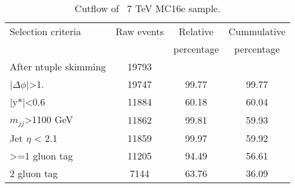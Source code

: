 \begin{table}[ht]
\begin{center}
\begin{tabular}{|l|c|c|c|}
\hline
Selection criteria & Raw events &  Relative & Cummulative \\
 & & percentage & percentage \\
\hline
After ntuple skimming & 19793 &  &  \\
$|\Delta\phi|$>1. & 19747 & 99.77 & 99.77 \\
|y*|<0.6 & 11884 & 60.18 & 60.04 \\
$m_{jj}$>1100 GeV & 11862 & 99.81 & 59.93 \\
Jet $\eta$ < 2.1 & 11859 & 99.97 & 59.92 \\
>=1 gluon tag & 11205 & 94.49 & 56.61 \\
2 gluon tag & 7144 & 63.76 & 36.09 \\
\hline
\end{tabular}
\end{center}
\caption{Cutflow of \Hprime\ 7 TeV MC16e sample.}
\label{tab:Hprime7MC16e}
\end{table}


